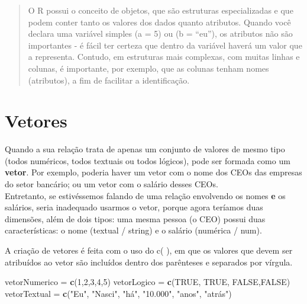 \documentclass[
]{book}
\newenvironment{Shaded}{\begin{snugshade}}{\end{snugshade}}
\newcommand{\DecValTok}[1]{\textcolor[rgb]{0.00,0.00,0.81}{#1}}
\newcommand{\KeywordTok}[1]{\textcolor[rgb]{0.13,0.29,0.53}{\textbf{#1}}}
\newcommand{\NormalTok}[1]{#1}
\newcommand{\OtherTok}[1]{\textcolor[rgb]{0.56,0.35,0.01}{#1}}
\newcommand{\StringTok}[1]{\textcolor[rgb]{0.31,0.60,0.02}{#1}}
\begin{document}
\begin{quote}
O R possui o conceito de objetos, que são estruturas especializadas e que podem conter tanto os valores dos dados quanto atributos. Quando você declara uma variável simples (a = 5) ou (b = ``eu''), os atributos não são importantes - é fácil ter certeza que dentro da variável haverá um valor que a representa. Contudo, em estruturas mais complexas, com muitas linhas e colunas, é importante, por exemplo, que as colunas tenham nomes (atributos), a fim de facilitar a identificação.
\end{quote}

\hypertarget{vetores}{%
\section{Vetores}\label{vetores}}

Quando a sua relação trata de apenas um conjunto de valores de mesmo tipo (todos numéricos, todos textuais ou todos lógicos), pode ser formada como um \textbf{vetor}. Por exemplo, poderia haver um vetor com o nome dos CEOs das empresas do setor bancário; ou um vetor com o salário desses CEOs.\\
Entretanto, se estivéssemos falando de uma relação envolvendo os nomes \textbf{e} os salários, seria inadequado usarmos o vetor, porque agora teríamos duas dimensões, além de dois tipos: uma mesma pessoa (o CEO) possui duas características: o nome (textual / string) e o salário (numérica / num).

A criação de vetores é feita com o uso do c( ), em que os valores que devem ser atribuídos ao vetor são incluídos dentro dos parênteses e separados por vírgula.

\begin{Shaded}
\begin{Highlighting}[]
\NormalTok{vetorNumerico =}\StringTok{ }\KeywordTok{c}\NormalTok{(}\DecValTok{1}\NormalTok{,}\DecValTok{2}\NormalTok{,}\DecValTok{3}\NormalTok{,}\DecValTok{4}\NormalTok{,}\DecValTok{5}\NormalTok{)}
\NormalTok{vetorLogico =}\StringTok{ }\KeywordTok{c}\NormalTok{(}\OtherTok{TRUE}\NormalTok{, }\OtherTok{TRUE}\NormalTok{, }\OtherTok{FALSE}\NormalTok{,}\OtherTok{FALSE}\NormalTok{)}
\NormalTok{vetorTextual =}\StringTok{ }\KeywordTok{c}\NormalTok{(}\StringTok{"Eu"}\NormalTok{, }\StringTok{"Nasci"}\NormalTok{, }\StringTok{"há"}\NormalTok{, }\StringTok{"10.000"}\NormalTok{, }\StringTok{"anos"}\NormalTok{, }\StringTok{"atrás"}\NormalTok{)}
\end{Highlighting}
\end{Shaded}
\end{document}
